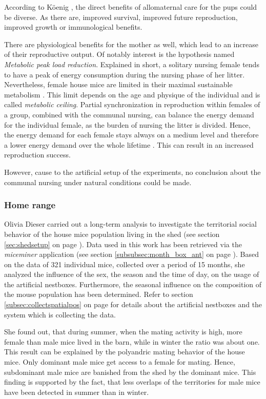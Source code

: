 According to K\"oenig \cite{koenig:06}, the direct benefits of allomaternal care for the pups could be diverse. As there are, improved survival, improved future reproduction, improved growth or immunological benefits.

There are physiological benefits for the mother as well, which lead to an increase of their reproductive output. Of notably interest is the hypothesis named \textit{Metabolic peak load reduction}. Explained in short, a solitary nursing female tends to have a peak of energy consumption during the nursing phase of her litter. Nevertheless, female house mice are limited in their maximal sustainable metabolism \cite{hammond:92}. This limit depends on the age and physique of the individual and is called \textit{metabolic ceiling}. Partial synchronization in reproduction within females of a group, combined with the communal nursing, can balance the energy demand for the individual female, as the burden of nursing the litter is divided. Hence, the energy demand for each female stays always on a medium level and therefore a lower energy demand over the whole lifetime \cite{koenig:06}. This can result in an increased reproduction success.

However, cause to the artificial setup of the experiments, no conclusion about the communal nursing under natural conditions could be made.

\subsubsection{Home range}
\label{subsubsec:homerange}

Olivia Dieser \cite{dieser:08} carried out a long-term analysis to investigate the territorial social behavior of the house mice population living in the shed (see section \ref{sec:shedsetup} on page \pageref{sec:shedsetup}). Data used in this work has been retrieved via the \textit{miceminer} application (see section \ref{subsubsec:month_box_ant} on page \pageref{subsubsec:month_box_ant}). Based on the data of 321 individual mice, collected over a period of 15 months, she analyzed the influence of the sex, the season and the time of day, on the usage of the artificial nestboxes. Furthermore, the seasonal influence on the composition of the mouse population has been determined. Refer to section \ref{subsec:collectspatialpos} on page \pageref{subsec:collectspatialpos} for details about the artificial nestboxes and the system which is collecting the data.

She found out, that during summer, when the mating activity is high, more female than male mice lived in the barn, while in winter the ratio was about one. This result can be explained by the polyandric mating behavior of the house mice. Only dominant male mice get access to a female for mating. Hence, subdominant male mice are banished from the shed by the dominant mice. This finding is supported by the fact, that less overlaps of the territories for male mice have been detected in summer than in winter. 

